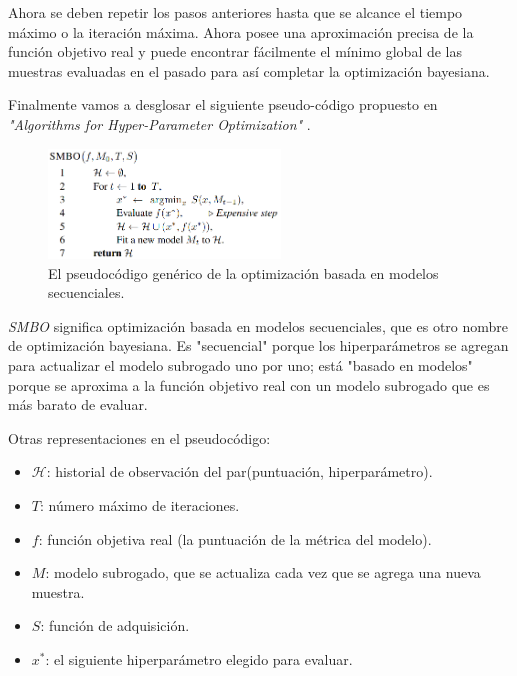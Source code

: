 \documentclass[a4paper,12pt]{article}
\begin{document}
Ahora se deben repetir los pasos anteriores hasta que se alcance el tiempo máximo o la iteración máxima. Ahora posee una aproximación precisa de la función objetivo real y puede encontrar fácilmente el mínimo global de las muestras evaluadas en el pasado para así completar la optimización bayesiana.

Finalmente vamos a desglosar el siguiente pseudo-código propuesto en \textit{"Algorithms for Hyper-Parameter Optimization"} \citep{smbo}.

\begin{figure}[H]
	\begin{center}
		\includegraphics[width=0.55\textwidth]{smbo.png}
		\caption{El pseudocódigo genérico de la optimización  basada en modelos secuenciales.}
		\label{fig:smbo}
	\end{center}
\end{figure}

\textit{SMBO} significa optimización basada en modelos secuenciales, que es otro nombre de optimización bayesiana. Es "secuencial" porque los hiperparámetros se agregan para actualizar el modelo subrogado uno por uno; está "basado en modelos" porque se aproxima a la función objetivo real con un modelo subrogado que es más barato de evaluar.

Otras representaciones en el pseudocódigo:
\begin{itemize}[noitemsep, topsep=2pt]
	\item{$\mathcal{H}$: historial de observación del par(puntuación, hiperparámetro).}
	\item{$T$: número máximo de iteraciones.}
	\item{$f$: función objetiva real (la puntuación de la métrica del modelo).}
	\item{$M$: modelo subrogado, que se actualiza cada vez que se agrega una nueva muestra.}
	\item{$S$: función de adquisición.}
	\item{$x^*$: el siguiente hiperparámetro elegido para evaluar.}
\end{itemize}

\bigskip
\end{document}
